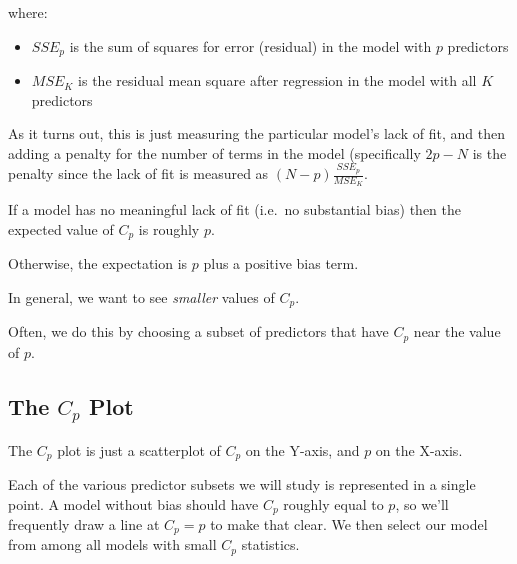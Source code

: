 \documentclass[]{book}
\newenvironment{Shaded}{\begin{snugshade}}{\end{snugshade}}
\newcommand{\KeywordTok}[1]{\textcolor[rgb]{0.13,0.29,0.53}{\textbf{#1}}}
\newcommand{\DataTypeTok}[1]{\textcolor[rgb]{0.13,0.29,0.53}{#1}}
\newcommand{\DecValTok}[1]{\textcolor[rgb]{0.00,0.00,0.81}{#1}}
\newcommand{\StringTok}[1]{\textcolor[rgb]{0.31,0.60,0.02}{#1}}
\newcommand{\OperatorTok}[1]{\textcolor[rgb]{0.81,0.36,0.00}{\textbf{#1}}}
\newcommand{\NormalTok}[1]{#1}
\providecommand{\tightlist}{%
  \setlength{\itemsep}{0pt}\setlength{\parskip}{0pt}}
\theoremstyle{definition}
\theoremstyle{definition}
\theoremstyle{definition}
\theoremstyle{remark}
\begin{document}
where:

\begin{itemize}
\tightlist
\item
  \(SSE_p\) is the sum of squares for error (residual) in the model with
  \(p\) predictors
\item
  \(MSE_K\) is the residual mean square after regression in the model
  with all \(K\) predictors
\end{itemize}

As it turns out, this is just measuring the particular model's lack of
fit, and then adding a penalty for the number of terms in the model
(specifically \(2p - N\) is the penalty since the lack of fit is
measured as \((N-p) \frac{SSE_p}{MSE_K}\).

If a model has no meaningful lack of fit (i.e.~no substantial bias) then
the expected value of \(C_p\) is roughly \(p\).

Otherwise, the expectation is \(p\) plus a positive bias term.

In general, we want to see \emph{smaller} values of \(C_p\).

Often, we do this by choosing a subset of predictors that have \(C_p\)
near the value of \(p\).

\subsection{\texorpdfstring{The \(C_p\)
Plot}{The C\_p Plot}}\label{the-c_p-plot}

The \(C_p\) plot is just a scatterplot of \(C_p\) on the Y-axis, and
\(p\) on the X-axis.

Each of the various predictor subsets we will study is represented in a
single point. A model without bias should have \(C_p\) roughly equal to
\(p\), so we'll frequently draw a line at \(C_p = p\) to make that
clear. We then select our model from among all models with small \(C_p\)
statistics.

\begin{Shaded}
\end{Shaded}
\end{document}
